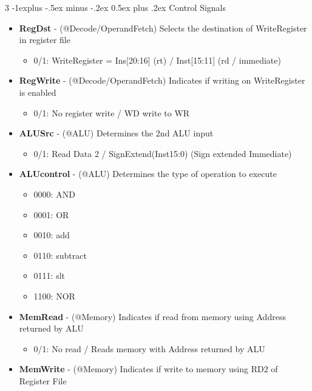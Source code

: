 \documentclass[10pt,landscape]{article}
\makeatletter
\renewcommand{\subsection}{\@startsection{subsection}{2}{0mm}%
    {-1explus -.5ex minus -.2ex}%
    {0.5ex plus .2ex}%
    {\normalfont\normalsize\bfseries}}
\makeatother
\begin{document}
\begin{multicols}{3}
    \subsection{Control Signals}
    \begin{itemize}
        \item \textbf{RegDst} - (@Decode/OperandFetch) Selects the destination of WriteRegister in register file
              \begin{itemize}
                  \item 0/1: WriteRegister = Ins[20:16] (rt) / Inst[15:11] (rd / immediate)
              \end{itemize}
        \item \textbf{RegWrite} - (@Decode/OperandFetch) Indicates if writing on WriteRegister is enabled
              \begin{itemize}
                  \item 0/1: No register write / WD write to WR
              \end{itemize}
        \item \textbf{ALUSrc} - (@ALU) Determines the 2nd ALU input
              \begin{itemize}
                  \item 0/1: Read Data 2 / SignExtend(Inst15:0) (Sign extended Immediate)
              \end{itemize}
        \item \textbf{ALUcontrol} - (@ALU) Determines the type of operation to execute
              \begin{itemize}
                  \item 0000: AND
                  \item 0001: OR
                  \item 0010: add
                  \item 0110: subtract
                  \item 0111: slt
                  \item 1100: NOR
              \end{itemize}
        \item \textbf{MemRead} - (@Memory) Indicates if read from memory using Address returned by ALU
              \begin{itemize}
                  \item 0/1: No read / Reads memory with Address returned by ALU
              \end{itemize}
        \item \textbf{MemWrite} - (@Memory) Indicates if write to memory using RD2 of Register File

\end{itemize}
\end{multicols}
\end{document}
